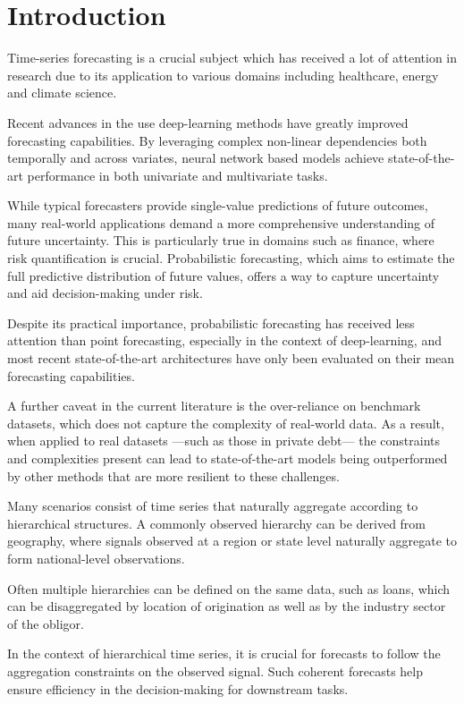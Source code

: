 \documentclass[letterpaper]{article}
\begin{document}
\section{Introduction}

Time-series forecasting is a crucial subject which has received a lot of attention in research due to its application to various domains including healthcare, energy and climate science.

Recent advances in the use deep-learning methods have greatly improved forecasting capabilities.
By leveraging complex non-linear dependencies both temporally and across variates, neural network based models achieve state-of-the-art performance in both univariate and multivariate tasks.

While typical forecasters provide single-value predictions of future outcomes, many real-world applications demand a more comprehensive understanding of future uncertainty. 
This is particularly true in domains such as finance, where risk quantification is crucial. 
Probabilistic forecasting, which aims to estimate the full predictive distribution of future values, offers a way to capture uncertainty and aid decision-making under risk.

Despite its practical importance, probabilistic forecasting has received less attention than point forecasting, 
especially in the context of deep-learning, and most recent state-of-the-art architectures have only been evaluated on their mean forecasting capabilities.

A further caveat in the current literature is the over-reliance on benchmark datasets, 
which does not capture the complexity of real-world data.
 As a result, when applied to real datasets ---such as those in private debt--- the constraints and complexities present can lead to state-of-the-art models being outperformed by other methods that are more resilient to these challenges. 

Many scenarios consist of time series that naturally aggregate according to hierarchical structures. A commonly observed hierarchy can be derived from geography, where signals observed at a region or state level naturally aggregate to form national-level observations.

Often multiple hierarchies can be defined on the same data, such as loans, which can be disaggregated by location of origination as well as by the industry sector of the obligor.

In the context of hierarchical time series, it is crucial for forecasts to follow the aggregation constraints on the observed signal. Such coherent forecasts help ensure efficiency in the decision-making for downstream tasks.
\end{document}
